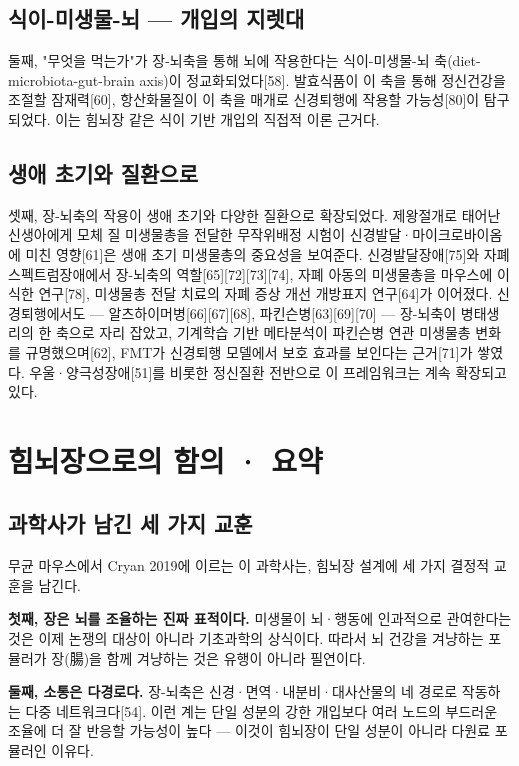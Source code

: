 \documentclass[11pt,oneside]{book}
\begin{document}
\subsection{식이-미생물-뇌 — 개입의 지렛대}
둘째, "무엇을 먹는가"가 장-뇌축을 통해 뇌에 작용한다는 식이-미생물-뇌 축(diet-microbiota-gut-brain axis)이 정교화되었다[58]. 발효식품이 이 축을 통해 정신건강을 조절할 잠재력[60], 항산화물질이 이 축을 매개로 신경퇴행에 작용할 가능성[80]이 탐구되었다. 이는 힘뇌장 같은 식이 기반 개입의 직접적 이론 근거다.

\subsection{생애 초기와 질환으로}
셋째, 장-뇌축의 작용이 생애 초기와 다양한 질환으로 확장되었다. 제왕절개로 태어난 신생아에게 모체 질 미생물총을 전달한 무작위배정 시험이 신경발달·마이크로바이옴에 미친 영향[61]은 생애 초기 미생물총의 중요성을 보여준다. 신경발달장애[75]와 자폐스펙트럼장애에서 장-뇌축의 역할[65][72][73][74], 자폐 아동의 미생물총을 마우스에 이식한 연구[78], 미생물총 전달 치료의 자폐 증상 개선 개방표지 연구[64]가 이어졌다. 신경퇴행에서도 — 알츠하이머병[66][67][68], 파킨슨병[63][69][70] — 장-뇌축이 병태생리의 한 축으로 자리 잡았고, 기계학습 기반 메타분석이 파킨슨병 연관 미생물총 변화를 규명했으며[62], FMT가 신경퇴행 모델에서 보호 효과를 보인다는 근거[71]가 쌓였다. 우울·양극성장애[51]를 비롯한 정신질환 전반으로 이 프레임워크는 계속 확장되고 있다.

\section{힘뇌장으로의 함의 · 요약}
\subsection{과학사가 남긴 세 가지 교훈}
무균 마우스에서 Cryan 2019에 이르는 이 과학사는, 힘뇌장 설계에 세 가지 결정적 교훈을 남긴다.

\textbf{첫째, 장은 뇌를 조율하는 진짜 표적이다.} 미생물이 뇌·행동에 인과적으로 관여한다는 것은 이제 논쟁의 대상이 아니라 기초과학의 상식이다. 따라서 뇌 건강을 겨냥하는 포뮬러가 장(腸)을 함께 겨냥하는 것은 유행이 아니라 필연이다.

\textbf{둘째, 소통은 다경로다.} 장-뇌축은 신경·면역·내분비·대사산물의 네 경로로 작동하는 다중 네트워크다[54]. 이런 계는 단일 성분의 강한 개입보다 여러 노드의 부드러운 조율에 더 잘 반응할 가능성이 높다 — 이것이 힘뇌장이 단일 성분이 아니라 다원료 포뮬러인 이유다.
\end{document}
